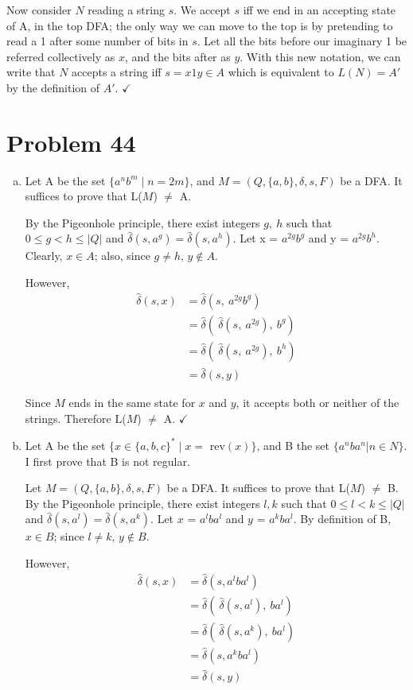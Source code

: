 \documentclass[11pt]{article}
\begin{document}
Now consider $N$ reading a string $s$. We accept $s$ iff we end in an accepting state of A, in the top DFA; the only way we can move to the top is by pretending to read a 1 after some number of bits in $s$. Let all the bits before our imaginary 1 be referred collectively as $x$, and the bits after as $y$. With this new notation, we can write that $N$ accepts a string iff $ s = x1y \in A$ which is equivalent to $L(N) = A'$ by the definition of $A'$. $\checkmark$

\section*{Problem 44}
\begin{enumerate}[(a)]
\item
Let A be the set $\{ a^nb^m \mid n = 2m \}$, and $M = (Q, \{a,b\}, \delta, s, F)$ be a DFA. It suffices to prove that L($M$) $\neq$ A.

By the Pigeonhole principle, there exist integers $g,\ h$ such that $0 \leq g < h \leq |Q|$ and $\hat{\delta}(s, a^g) = \hat{\delta}(s, a^h)$. Let x = $a^{2g}b^g$ and y = $a^{2g}b^h$. Clearly, $x \in A$; also, since  $g \neq h$, $y \not\in A$.

However,
\begin{align*}
	\hat{\delta}(s, x) &= \hat{\delta}(s,\ a^{2g}b^g) \\
	&= \hat{\delta}(\ \hat{\delta} (s,\ a^{2g}),\ b^g ) \\	
	&= \hat{\delta}(\ \hat{\delta} (s,\ a^{2g}),\ b^h ) \\
	&= \hat{\delta}(s, y)
\end{align*}

Since $M$ ends in the same state for $x$ and $y$, it accepts both or neither of the strings. Therefore L($M$) $\neq$ A. $\checkmark$

\item

Let A be the set $\{ x \in \{ a,b,c \}^* \mid x = $ rev$(x) \}$, and B the set $ \{ a^n ba^n | n \in N \}$. I first prove that B is not regular.

Let $M = (Q, \{a,b\}, \delta, s, F)$ be a DFA. It suffices to prove that L($M$) $\neq$ B. By the Pigeonhole principle, there exist integers $l, k$ such that $0 \leq l < k \leq |Q|$ and $\hat{\delta}(s, a^l) = \hat{\delta}(s, a^k)$. Let $x$ = $a^lba^l$ and $y$ = $a^kba^l$. By definition of B, $x \in B$; since $l \neq k$, $y \not\in B$.

However,
\begin{align*}
\hat{\delta}(s, x) &= \hat{\delta}(s, a^lba^l) \\
&= \hat{\delta}(\ \hat{\delta}(s, a^l),\ ba^l) \\
&= \hat{\delta}(\ \hat{\delta}(s, a^k),\ ba^l) \\
&= \hat{\delta}(s, a^kba^l) \\
&= \hat{\delta}(s, y)
\end{align*}


\end{enumerate}
\end{document}
